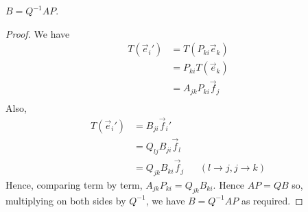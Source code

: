 \documentclass{../../template/note}
\begin{document}
    \begin{proposition}
        \(B = Q^{-1}AP\).
    \end{proposition}
    
    \begin{proof}
        We have
        \begin{align*}
            T(\vec e_i') &= T(P_{ki}\vec e_k) \\
            &= P_{ki} T(\vec e_k) \\
            &= A_{jk} P_{ki} \vec f_j \\ 
        \end{align*}
        Also,
        \begin{align*}
            T(\vec e_i') &= B_{ji} \vec f_i' \\
            &= Q_{lj} B_{ji} \vec f_l \\
            &= Q_{jk} B_{ki} \vec f_j && (l \to j, j \to k)
        \end{align*}
        Hence, comparing term by term, \(A_{jk}P_{ki} = Q_{jk}B_{ki}\). Hence \(AP = QB\) so, multiplying on both sides by \(Q^{-1}\), we have \(B = Q^{-1}AP\) as required.
    \end{proof}
    
\end{document}
